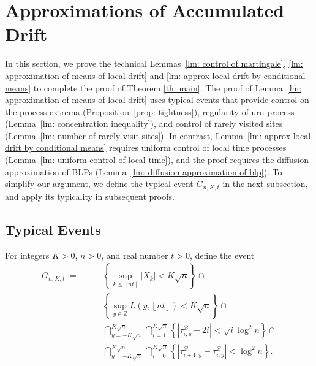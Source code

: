 \documentclass[EJP]{ejpecp} %
\begin{document}
\section{Approximations of Accumulated Drift}\label{sec: approximations}

In this section, we prove the technical Lemmas~\ref{lm: control of martingale}, \ref{lm: approximation of means of local drift} and \ref{lm: approx local drift by conditional means} to complete  the proof of Theorem \ref{th: main}. 
The proof of Lemma~\ref{lm: approximation of means of local drift} uses typical events that provide control on the process extrema (Proposition~\ref{prop: tightness}), regularity of urn process (Lemma~\ref{lm: concentration inequality}), and control of rarely visited sites (Lemma~\ref{lm: number of rarely visit sites}). 
In contrast, Lemma~\ref{lm: approx local drift by conditional means} requires uniform control of local time processes (Lemma~\ref{lm: uniform control of local time}), and the proof requires the diffusion approximation of BLPs (Lemma~\ref{lm: diffusion approximation of blp}).
To simplify our argument, we define the typical event $G_{n, K, t}$ in the next subsection, and apply its typicality in subsequent proofs.

\subsection{Typical Events}

For integers $K>0$, $n > 0$, and real number $t>0$, define the event
\begin{align}
	G_{n,K,t} :=  \qquad
	\label{eq:good-event-1}
	& \left\{\sup _{k \le \left\lfloor nt  \right\rfloor} |X_k| < K \sqrt{n} \right\} \cap \\
	\label{eq:good-event-2}
	& \left\{\sup_{y \in \mathbb{Z}} L(y, \left\lfloor nt  \right\rfloor) < K \sqrt{n} \right\} \cap \\
	\label{eq:good-event-3}
	& \bigcap_{y = - K \sqrt{n} }^{K \sqrt{n}} 
	\bigcap_{i = 1}^{K \sqrt{n} } \left\{\left| \tau_{i,y}^{\mathscr{B}} - 2 i \right| < \sqrt{ i } \log^2 n \right\}  \cap \\
	\label{eq:good-event-4}
	& \bigcap_{y = - K \sqrt{n} }^{K \sqrt{n}} 
	\bigcap_{i = 0}^{K \sqrt{n} } \left\{\left| \tau_{i+1, y}^{\mathscr{B}} - \tau_{i,y}^{\mathscr{B}} \right| < \log^2 n \right\}  
	.\end{align}
\end{document}
